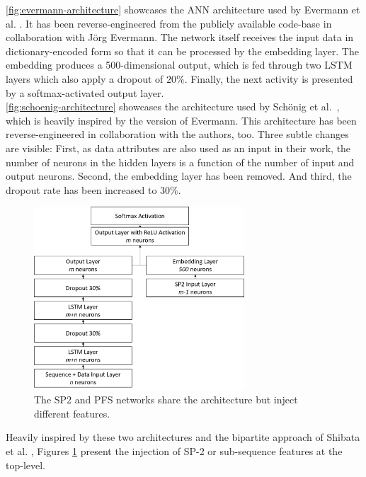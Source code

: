 \autoref{fig:evermann-architecture} showcases the ANN architecture used by Evermann et al. \cite{evermann2016}. It has been reverse-engineered from the publicly available code-base \cite{web:evermann} in collaboration with Jörg Evermann. The network itself receives the input data in dictionary-encoded form so that it can be processed by the embedding layer. The embedding produces a 500-dimensional output, which is fed through two LSTM layers which also apply a dropout of $20\%$. Finally, the next activity is presented by a softmax-activated output layer.\\

\autoref{fig:schoenig-architecture} showcases the architecture used by Schönig et al.~\cite{schoenig2018}, which is heavily inspired by the version of Evermann. This architecture has been reverse-engineered in collaboration with the authors, too. Three subtle changes are visible: First, as data attributes are also used as an input in their work, the number of neurons in the hidden layers is a function of the number of input and output neurons. Second, the embedding layer has been removed. And third, the dropout rate has been increased to $30\%$.

\begin{figure}
    \centering
    \includegraphics[width=0.7\textwidth]{gfx/sp2-network-architecture.png}
    \caption{The SP2 and PFS networks share the architecture but inject different features.}
    \label{fig:sp2-pfs-architecture}
\end{figure}

Heavily inspired by these two architectures and the bipartite approach of Shibata et al. \cite{shibata2016bipartite}, Figures \ref{fig:sp2-pfs-architecture} present the injection of SP-2 or sub-sequence features at the top-level.

